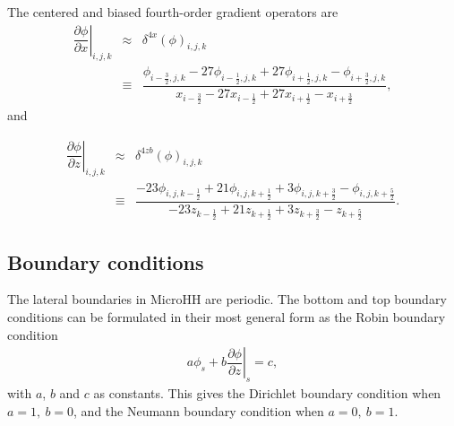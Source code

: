 \documentclass[gmd,manuscript]{copernicus}
\begin{document}
The centered and biased fourth-order gradient operators are
\begin{eqnarray}
\nonumber
\left. \dfrac{\partial \phi}{\partial x}\right|_{i,j,k} & \approx & \delta^{4x} \left( \phi \right)_{i,j,k}\\
& \equiv & \dfrac{\phi_{i-\frac{3}{2},j,k} - 27 \phi_{i-\frac{1}{2},j,k} + 27 \phi_{i+\frac{1}{2},j,k} - \phi_{i+\frac{3}{2},j,k}}
             {       x_{i-\frac{3}{2}}   - 27    x_{i-\frac{1}{2}}   + 27    x_{i+\frac{1}{2}}   -    x_{i+\frac{3}{2}}},
\end{eqnarray}
and

\begin{eqnarray}
\nonumber
\left. \dfrac{\partial \phi}{\partial z}\right|_{i,j,k} & \approx & \delta^{4zb} \left( \phi \right)_{i,j,k}\\
& \equiv & \dfrac{-23 \phi_{i,j,k-\frac{1}{2}} + 21 \phi_{i,j,k+\frac{1}{2}} + 3 \phi_{i,j,k+\frac{3}{2}} - \phi_{i,j,k+\frac{5}{2}}}
                 {-23    z_{k-\frac{1}{2}}   + 21    z_{k+\frac{1}{2}}   + 3    z_{k+\frac{3}{2}}   -    z_{k+\frac{5}{2}}}.\label{eq:grad_biased}
\end{eqnarray}



\subsection{Boundary conditions}
The lateral boundaries in MicroHH are periodic. The bottom and top boundary conditions can be formulated in their most general form as the Robin boundary condition
\begin{eqnarray}
a \phi_s + b \left.\dfrac{\partial \phi}{\partial z}\right|_s = c,
\end{eqnarray}
with $a$, $b$ and $c$ as constants. This gives the Dirichlet boundary condition when ${a=1,~b=0}$, and the Neumann boundary condition when ${a=0,~b=1}$. 
\end{document}
